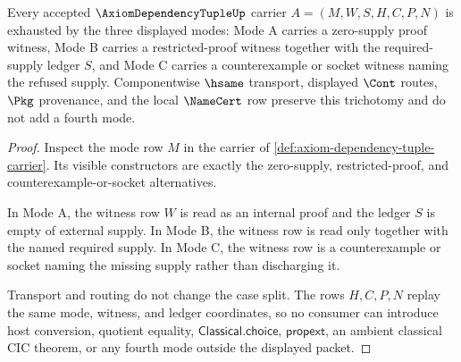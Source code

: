 \begin{theorem}
\label{thm:axiom-dependency-tuple-mode-exhaustion}
Every accepted $\AxiomDependencyTupleUp$ carrier
$A=(M,W,S,H,C,P,N)$ is exhausted by the three displayed modes: Mode A carries
a zero-supply proof witness, Mode B carries a restricted-proof witness
together with the required-supply ledger $S$, and Mode C carries a
counterexample or socket witness naming the refused supply. Componentwise
$\hsame$ transport, displayed $\Cont$ routes, $\Pkg$ provenance, and the local
$\NameCert$ row preserve this trichotomy and do not add a fourth mode.
\end{theorem}
\begin{proof}
Inspect the mode row $M$ in the carrier of
\autoref{def:axiom-dependency-tuple-carrier}. Its visible constructors are
exactly the zero-supply, restricted-proof, and counterexample-or-socket
alternatives.

In Mode A, the witness row $W$ is read as an internal proof and the ledger
$S$ is empty of external supply. In Mode B, the witness row is read only
together with the named required supply. In Mode C, the witness row is a
counterexample or socket naming the missing supply rather than discharging it.

Transport and routing do not change the case split. The rows $H,C,P,N$ replay
the same mode, witness, and ledger coordinates, so no consumer can introduce
host conversion, quotient equality, $\mathsf{Classical.choice}$,
$\mathsf{propext}$, an ambient classical CIC theorem, or any fourth mode
outside the displayed packet.
\end{proof}

